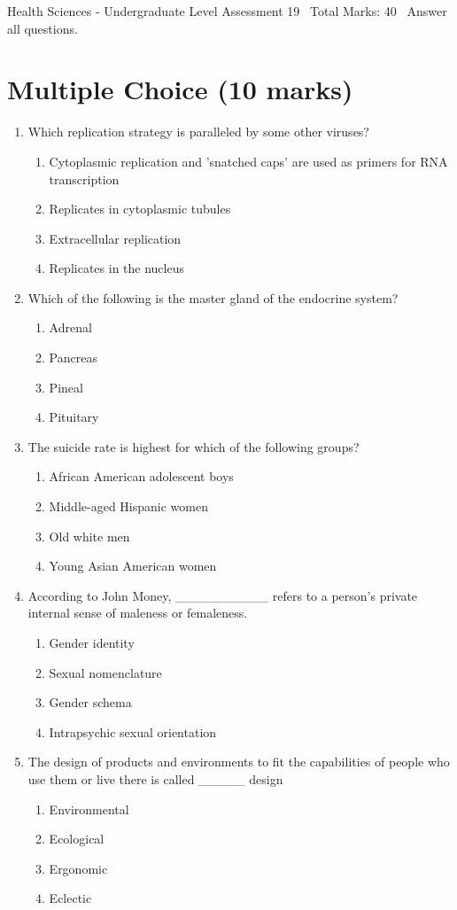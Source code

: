 \documentclass[12pt]{article}
\begin{document}
\begin{center}
Health Sciences - Undergraduate Level Assessment 19 \
Total Marks: 40 \
Answer all questions.
\end{center}

\section*{Multiple Choice (10 marks)}
\begin{enumerate}[label=\arabic*.]
\item Which replication strategy is paralleled by some other viruses?
\begin{enumerate}[label=(\alph*)]
    \item Cytoplasmic replication and 'snatched caps' are used as primers for RNA transcription
    \item Replicates in cytoplasmic tubules
    \item Extracellular replication
    \item Replicates in the nucleus
\end{enumerate}
\item Which of the following is the master gland of the endocrine system?
\begin{enumerate}[label=(\alph*)]
    \item Adrenal
    \item Pancreas
    \item Pineal
    \item Pituitary
\end{enumerate}
\item The suicide rate is highest for which of the following groups?
\begin{enumerate}[label=(\alph*)]
    \item African American adolescent boys
    \item Middle-aged Hispanic women
    \item Old white men
    \item Young Asian American women
\end{enumerate}
\item According to John Money, \_\_\_\_\_\_\_\_\_\_ refers to a person's private internal sense of maleness or femaleness.
\begin{enumerate}[label=(\alph*)]
    \item Gender identity
    \item Sexual nomenclature
    \item Gender schema
    \item Intrapsychic sexual orientation
\end{enumerate}
\item The design of products and environments to fit the capabilities of people who use them or live there is called \_\_\_\_\_ design
\begin{enumerate}[label=(\alph*)]
    \item Environmental
    \item Ecological
    \item Ergonomic
    \item Eclectic
\end{enumerate}
\end{enumerate}
\end{document}

